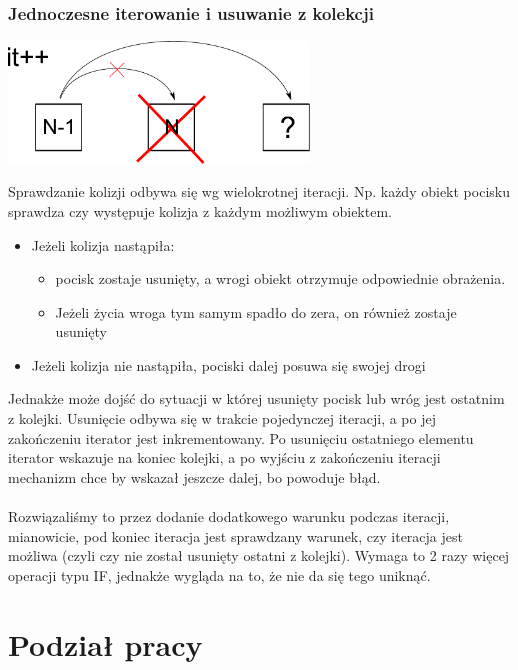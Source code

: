 \documentclass[a4paper,twoside]{article}
\begin{document}
		\section{Jednoczesne iterowanie i usuwanie z kolekcji}
			\begin{center}
				\includegraphics[width=0.6\textwidth]{./images/iteracja01}
			\end{center}
			Sprawdzanie kolizji odbywa się wg wielokrotnej iteracji. Np. każdy obiekt pocisku sprawdza czy występuje kolizja z każdym możliwym obiektem.
			\begin{itemize}
				\item Jeżeli kolizja nastąpiła:
				\begin{itemize}
					\item pocisk zostaje usunięty, a wrogi obiekt otrzymuje odpowiednie obrażenia.
					\item Jeżeli życia wroga tym samym spadło do zera, on również zostaje usunięty
				\end{itemize}
				\item Jeżeli kolizja nie nastąpiła, pociski dalej posuwa się swojej drogi
			\end{itemize}
			Jednakże może dojść do sytuacji w której usunięty pocisk lub wróg jest ostatnim z kolejki. Usunięcie odbywa się w trakcie pojedynczej iteracji, a po jej zakończeniu iterator jest inkrementowany. Po usunięciu ostatniego elementu iterator wskazuje na koniec kolejki, a po wyjściu z zakończeniu iteracji mechanizm chce by wskazał jeszcze dalej, bo powoduje błąd.\\\\
			Rozwiązaliśmy to przez dodanie dodatkowego warunku podczas iteracji, mianowicie, pod koniec iteracja jest sprawdzany warunek, czy iteracja jest możliwa (czyli czy nie został usunięty ostatni z kolejki). Wymaga to 2 razy więcej operacji typu IF, jednakże wygląda na to, że nie da się tego uniknąć. 
			
	
	\newpage
	\part{Podział pracy}
	
	
	
	
	
	
	
	
	
	
	
	
	
	
	
	
	
	
	
	
	
	
	
	
	
	
	
	
	
	
	
	
\end{document}
